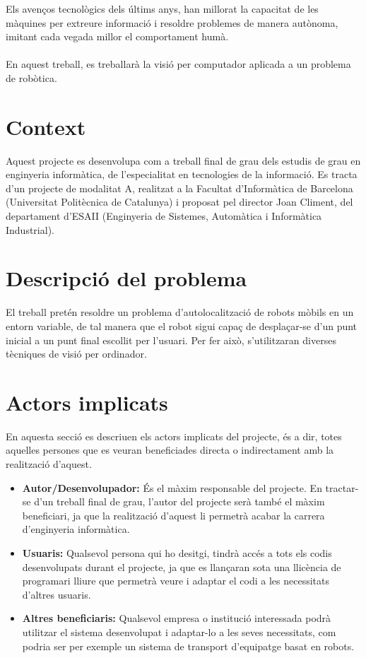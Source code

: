 Els avenços tecnològics dels últims anys, han millorat la capacitat de les màquines per extreure informació i resoldre problemes de manera autònoma, imitant cada vegada millor
el comportament humà.\\\\
En aquest treball, es treballarà la visió per computador aplicada a un problema de robòtica.
\section{Context}
	Aquest projecte es desenvolupa com a treball final de grau dels estudis de grau en enginyeria informàtica, de l'especialitat en tecnologies de la informació.
	Es tracta d'un projecte de modalitat A, realitzat a la Facultat d'Informàtica de Barcelona (Universitat Politècnica de Catalunya) i proposat pel director Joan Climent,
	del departament d'ESAII (Enginyeria de Sistemes, Automàtica i Informàtica Industrial).
\section{Descripció del problema}
	El treball pretén resoldre un problema d'autolocalització de robots mòbils en un entorn variable, de tal manera que el robot sigui capaç de desplaçar-se d'un punt inicial a un punt final escollit per l'usuari.
	Per fer això, s'utilitzaran diverses tècniques de visió per ordinador.
\section{Actors implicats}
	En aquesta secció es descriuen els actors implicats del projecte, és a dir, totes aquelles persones que es veuran beneficiades directa o indirectament amb la realització d'aquest.\\
	\begin{itemize}
		\item \textbf{Autor/Desenvolupador:} És el màxim responsable del projecte. En tractar-se d'un treball final de grau, l'autor del projecte serà també el màxim beneficiari, ja que la realització d'aquest li permetrà acabar la carrera d'enginyeria informàtica.
		\item \textbf{Usuaris:} Qualsevol persona qui ho desitgi, tindrà accés a tots els codis desenvolupats durant el projecte, ja que es llançaran sota una llicència de programari lliure que permetrà veure i adaptar el codi a les necessitats d'altres usuaris.
		\item \textbf{Altres beneficiaris:} Qualsevol empresa o institució interessada podrà utilitzar el sistema desenvolupat i adaptar-lo a les seves necessitats, com podria ser per exemple un sistema de transport d'equipatge basat en robots.
	\end{itemize}

